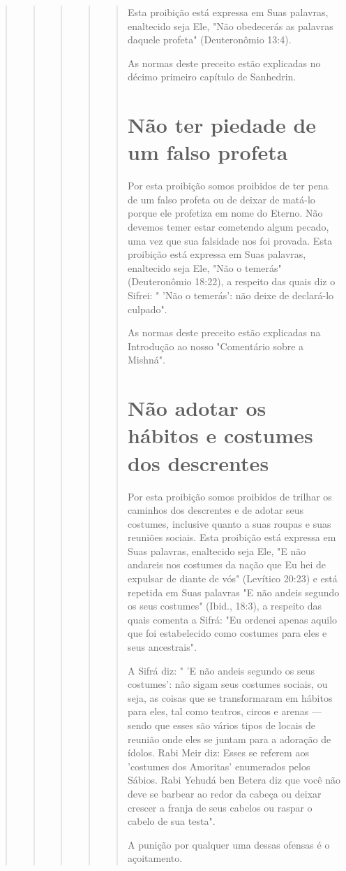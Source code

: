 \begin{quote}
\begin{quote}
\begin{quote}
\begin{quote}
\begin{quote}
Esta proibição está expressa em Suas palavras, enaltecido seja Ele, "Não
obedecerás as palavras daquele profeta" (Deuteronômio 13:4).

As normas deste preceito estão explicadas no décimo primeiro capí­tulo
de Sanhedrin.

\section{Não ter piedade de um falso profeta}

Por esta proibição somos proibidos de ter pena de um falso profeta ou de
deixar de matá-lo porque ele profetiza em nome do Eterno. Não deve­mos
temer estar cometendo algum pecado, uma vez que sua falsidade nos foi
provada. Esta proibição está expressa em Suas palavras, enaltecido seja
Ele, "Não o temerás" (Deuteronômio 18:22), a respeito das quais diz o
Sifrei: " 'Não o temerás': não deixe de declará-lo culpado".

As normas deste preceito estão explicadas na Introdução ao nosso
"Comentário sobre a Mishná".

\section{Não adotar os hábitos e costumes dos descrentes}

Por esta proibição somos proibidos de trilhar os caminhos dos
des­crentes e de adotar seus costumes, inclusive quanto a suas roupas e
suas reu­niões sociais. Esta proibição está expressa em Suas palavras,
enaltecido seja Ele, "E não andareis nos costumes da nação que Eu hei de
expulsar de diante de vós" (Levítico 20:23) e está repetida em Suas
palavras "E não andeis segundo os seus costumes" (Ibid., 18:3), a
respeito das quais comenta a Sifrá: "Eu ordenei ape­nas aquilo que foi
estabelecido como costumes para eles e seus ancestrais".

A Sifrá diz: " 'E não andeis segundo os seus costumes': não sigam seus
costumes sociais, ou seja, as coisas que se transformaram em hábitos
para eles, tal como teatros, circos e arenas --- sendo que esses são
vários tipos de locais de reunião onde eles se juntam para a adoração de
ídolos. Rabi Meir diz: Esses se referem aos 'costumes dos Amoritas'
enumerados pelos Sábios. Rabi Yehudá ben Betera diz que você não deve se
barbear ao redor da cabeça ou deixar crescer a franja de seus cabelos ou
raspar o cabelo de sua testa".

A punição por qualquer uma dessas ofensas é o açoitamento.


\end{quote}
\end{quote}
\end{quote}
\end{quote}
\end{quote}
